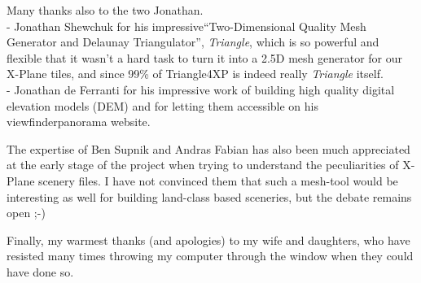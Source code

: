 \documentclass[12pt]{article}
\begin{document}
\smallskip

\noindent Many thanks also to the two Jonathan.\\
- Jonathan Shewchuk for his impressive``Two-Dimensional Quality Mesh Generator and Delaunay Triangulator'', {\it Triangle}, which is so powerful and flexible that it wasn't a hard task to turn it into a 2.5D mesh generator for our X-Plane tiles, and since 99\% of Triangle4XP is indeed really {\it Triangle} itself.\\
- Jonathan de Ferranti for his impressive work of building high quality digital elevation models (DEM) and for letting them accessible on his viewfinderpanorama website.

\smallskip

\noindent The expertise of Ben Supnik and Andras Fabian has also been much appreciated at the early stage of the project when trying to understand the peculiarities of X-Plane scenery files. I have not convinced them that such a mesh-tool would be interesting as well for building land-class based sceneries, but the debate remains open ;-)

\medskip

\noindent Finally, my warmest thanks (and apologies) to my wife and daughters, who have resisted many times throwing my computer through the window when they could have done so.
\end{document}
